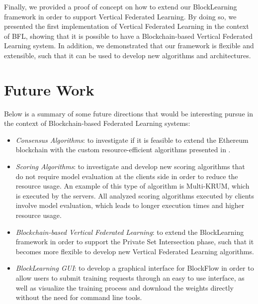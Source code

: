 Finally, we provided a proof of concept on how to extend our BlockLearning framework in order to support Vertical Federated Learning. By doing so, we presented the first implementation of Vertical Federated Learning in the context of BFL, showing that it is possible to have a Blockchain-based Vertical Federated Learning system. In addition, we demonstrated that our framework is flexible and extensible, such that it can be used to develop new algorithms and architectures.

\section{Future Work}\label{conclusions:future_work}

Below is a summary of some future directions that would be interesting pursue in the context of Blockchain-based Federated Learning systems:

\begin{itemize}
    \item \textit{Consensus Algorithms}: to investigate if it is feasible to extend the Ethereum blockchain with the custom resource-efficient algorithms presented in .
    
    \item \textit{Scoring Algorithms}: to investigate and develop new scoring algorithms that do not require model evaluation at the clients side in order to reduce the resource usage. An example of this type of algorithm is Multi-KRUM, which is executed by the servers. All analyzed scoring algorithms executed by clients involve model evaluation, which leads to longer execution times and higher resource usage.
    
    \item \textit{Blockchain-based Vertical Federated Learning}: to extend the BlockLearning framework in order to support the Private Set Intersection phase, such that it becomes more flexible to develop new Vertical Federated Learning algorithms.
    
    \item \textit{BlockLearning GUI}: to develop a graphical interface for BlockFlow in order to allow users to submit training requests through an easy to use interface, as well as visualize the training process and download the weights directly without the need for command line tools.
\end{itemize}

